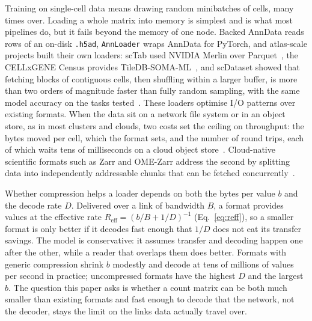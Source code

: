 Training on single-cell data means drawing random minibatches of cells, many times over. Loading a whole matrix into
memory is simplest and is what most pipelines do, but it fails beyond the memory of one node. Backed AnnData reads
rows of an on-disk \texttt{.h5ad}, \texttt{AnnLoader} wraps AnnData for PyTorch, and atlas-scale projects built their own
loaders: scTab used NVIDIA Merlin over Parquet~\cite{fischer2024scaling}, the CELLxGENE Census provides
TileDB-SOMA-ML~\cite{tiledbsomaml,czi2025cellxgene}, and scDataset showed that fetching blocks of contiguous cells, then
shuffling within a larger buffer, is more than two orders of magnitude faster than fully random sampling, with the same
model accuracy on the tasks tested~\cite{dascenzo2025scdataset}. These loaders optimise I/O patterns over existing
formats. When the data sit on a network file system or in an object store, as in most clusters and clouds, two costs set
the ceiling on throughput: the bytes moved per cell, which the format sets, and the number of round trips, each of which
waits tens of milliseconds on a cloud object store~\cite{durner2023exploiting}. Cloud-native scientific formats such as
Zarr and OME-Zarr address the second by splitting data into independently addressable chunks that can be fetched
concurrently~\cite{abernathey2021cloud,moore2021omengff}.

Whether compression helps a loader depends on both the bytes per value $b$ and the decode rate $D$. Delivered over a link of
bandwidth $B$, a format provides values at the effective rate $R_{\mathrm{eff}} = (b/B + 1/D)^{-1}$ (Eq.~\ref{eq:reff}),
so a smaller format is only better if it decodes fast enough that $1/D$ does not eat its transfer savings. The model
is conservative: it assumes transfer and decoding happen one after the other, while a reader that overlaps them does
better. Formats with generic compression shrink $b$ modestly and decode at tens of millions of values per second in
practice; uncompressed formats have the highest $D$ and the largest $b$. The question this paper asks is whether a count
matrix can be both much smaller than existing formats and fast enough to decode that the network, not the decoder,
stays the limit on the links data actually travel over.
